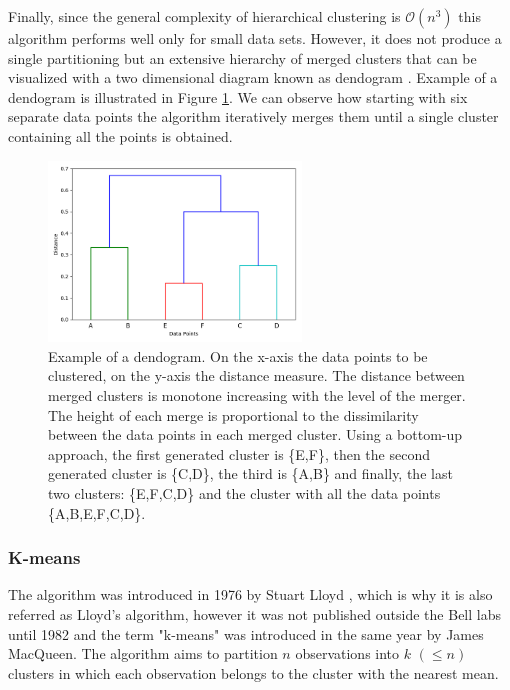 Finally, since the general complexity of hierarchical clustering is $\mathcal{O}(n^3)$ this algorithm performs well only for small data sets. However, it does not produce a single partitioning but an extensive hierarchy of merged clusters that can be visualized with a two dimensional diagram known as dendogram \cite{everitt_hierarchical_2011}. Example of a dendogram is illustrated in Figure \ref{fig:dendogram_example}. We can observe how starting with six separate data points the algorithm iteratively merges them until a single cluster containing all the points is obtained.  
\begin{figure}[ht]
    \centering
    \includegraphics[width=0.6\textwidth]{masters-thesis-master/masters-thesis/contents/02_background/dendogram_example.png}
    \caption{Example of a dendogram. On the x-axis the data points to be clustered, on the y-axis the distance measure. The distance between merged clusters is monotone increasing with the level of the merger. The height of each merge is proportional to the dissimilarity between the data points in each merged cluster. Using a bottom-up approach, the first generated cluster is \{E,F\}, then the second generated cluster is \{C,D\}, the third is \{A,B\} and finally, the last two clusters: \{E,F,C,D\} and the cluster with all the data points \{A,B,E,F,C,D\}.}
    \label{fig:dendogram_example}
\end{figure}

\subsubsection*{K-means}
The algorithm was introduced in 1976 by Stuart Lloyd \cite{lloyd_least_1982}, which is why it is also referred as Lloyd's algorithm, however it was not published outside the Bell labs until 1982 and the term "k-means" was introduced in the same year by James MacQueen. The algorithm aims to partition $n$ observations into $k$  $(\leq n)$ clusters in which each observation belongs to the cluster with the nearest mean. 

